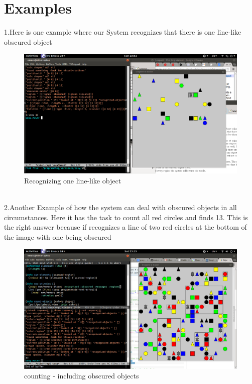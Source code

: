 \documentclass[final,paper=a4,paper=portraitmpagesize=auto,fontsize=11pt,ngerman]{scrartcl}
\begin{document}
\section{Examples}
\label{sec-3}
1.Here is one example where our System recognizes that there is
one line-like obscured object
 \begin{figure}[hbtp]
      \centering
      \includegraphics[width= 0.7 \textwidth]{count_obscured}
      \caption{Recognizing one line-like object}
      \label{fig:aufbau}
  \end{figure} \\
2.Another Example of how the system can deal with obscured objects
in all circumstances. Here it has the task to count all red circles
and finds 13. This is the right answer because if recognizes a 
line of two red circles at the bottom of the image with one
being obscured
 \begin{figure}[hbtp]
      \centering
      \includegraphics[width= 0.7 \textwidth]{count_red_circles}
      \caption{counting - including obscured objects}
      \label{fig:aufbau}
  \end{figure}
\end{document}
